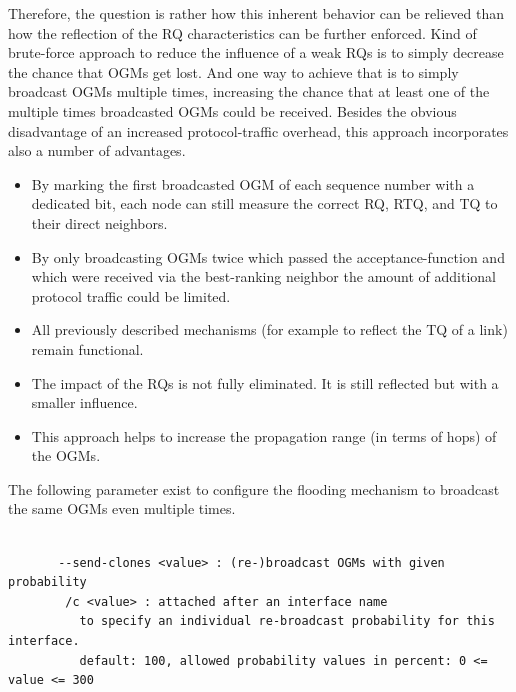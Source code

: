 \documentclass[11pt]{article}
\begin{document}
%
%
%
%
Therefore, the question is rather how this inherent behavior can be relieved than how the reflection of the RQ characteristics can be further enforced.
%
Kind of brute-force approach to reduce the influence of a weak RQs is to simply decrease the chance that OGMs get lost. 
%
And one way to achieve that is to simply broadcast OGMs multiple times, increasing the chance that at least one of the multiple times broadcasted OGMs could be received.
%
Besides the obvious disadvantage of an increased protocol-traffic overhead, this approach incorporates also a number of advantages.

\begin{itemize}

 \item By marking the first broadcasted OGM of each sequence number with a dedicated bit, each node can still measure the correct RQ, RTQ, and TQ to their direct neighbors.

 \item By only broadcasting OGMs twice which passed the acceptance-function and which were received via the best-ranking neighbor the amount of additional protocol traffic could be limited.

 \item All previously described mechanisms (for example to reflect the TQ of a link) remain functional.

 \item The impact of the RQs is not fully eliminated. It is still reflected but with a smaller influence.

 \item This approach helps to increase the propagation range (in terms of hops) of the OGMs. 

\end{itemize}

The following parameter exist to configure the flooding mechanism to broadcast the same OGMs even multiple times.
%

\begin{small}
\begin{verbatim}

       --send-clones <value> : (re-)broadcast OGMs with given probability
        /c <value> : attached after an interface name
          to specify an individual re-broadcast probability for this interface.
          default: 100, allowed probability values in percent: 0 <= value <= 300

\end{verbatim}
\end{small}
\end{document}
